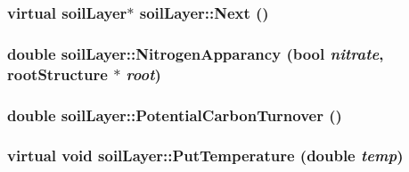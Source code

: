\label{classsoil_layer_a7d58b327ed2900ba76920934d1802da2}
\hypertarget{classsoil_layer_a53b5e6743e808dd6516867c5de2a0ded}{
\subsubsection[{Next}]{\setlength{\rightskip}{0pt plus 5cm}virtual {\bf soilLayer}$\ast$ soilLayer::Next ()}}
\label{classsoil_layer_a53b5e6743e808dd6516867c5de2a0ded}
\hypertarget{classsoil_layer_a02f95c5adb418377eef715b4c8d50eef}{
\subsubsection[{NitrogenApparancy}]{\setlength{\rightskip}{0pt plus 5cm}double soilLayer::NitrogenApparancy (bool {\em nitrate}, \/  {\bf rootStructure} $\ast$ {\em root})}}
\label{classsoil_layer_a02f95c5adb418377eef715b4c8d50eef}
\hypertarget{classsoil_layer_ae664742ac96eb6f49caa66e8c4b8d708}{
\subsubsection[{PotentialCarbonTurnover}]{\setlength{\rightskip}{0pt plus 5cm}double soilLayer::PotentialCarbonTurnover ()}}
\label{classsoil_layer_ae664742ac96eb6f49caa66e8c4b8d708}
\hypertarget{classsoil_layer_a6b3b3438c29df1bf4037d00875b676e7}{
\subsubsection[{PutTemperature}]{\setlength{\rightskip}{0pt plus 5cm}virtual void soilLayer::PutTemperature (double {\em temp})}}
\label{classsoil_layer_a6b3b3438c29df1bf4037d00875b676e7}
